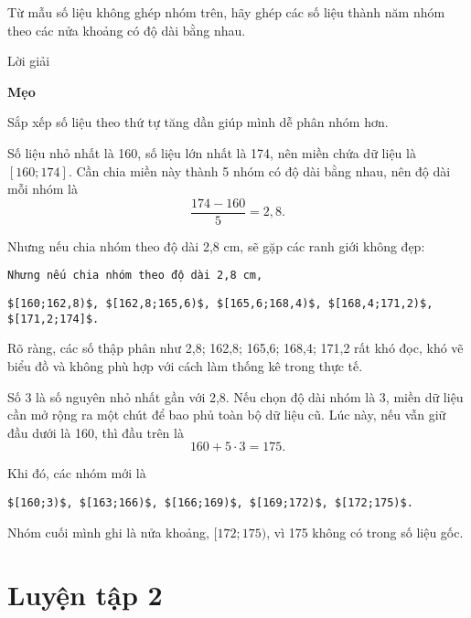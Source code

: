 \documentclass[
  letterpaper,
  DIV=11,
  numbers=noendperiod]{scrartcl}
\begin{document}
Từ mẫu số liệu không ghép nhóm trên, hãy ghép các số liệu thành năm nhóm
theo các nửa khoảng có độ dài bằng nhau.

\begin{center}
Lời giải
\end{center}

\begin{tcolorbox}[enhanced jigsaw, toprule=.15mm, colback=white, arc=.35mm, left=2mm, opacityback=0, breakable, rightrule=.15mm, bottomrule=.15mm, colframe=quarto-callout-note-color-frame, leftrule=.75mm]

\vspace{-3mm}\textbf{Mẹo}\vspace{3mm}

Sắp xếp số liệu theo thứ tự tăng dần giúp mình dễ phân nhóm hơn.

\end{tcolorbox}

Số liệu nhỏ nhất là 160, số liệu lớn nhất là 174, nên miền chứa dữ liệu
là \([160; 174]\). Cần chia miền này thành 5 nhóm có độ dài bằng nhau,
nên độ dài mỗi nhóm là \[
    \frac{174-160}{5}=2,8.
\]

Nhưng nếu chia nhóm theo độ dài 2,8 cm, sẽ gặp các ranh giới không đẹp:

\begin{verbatim}
Nhưng nếu chia nhóm theo độ dài 2,8 cm,
\end{verbatim}

\begin{verbatim}
$[160;162,8)$, $[162,8;165,6)$, $[165,6;168,4)$, $[168,4;171,2)$, $[171,2;174]$.
\end{verbatim}

Rõ ràng, các số thập phân như 2,8; 162,8; 165,6; 168,4; 171,2 rất khó
đọc, khó vẽ biểu đồ và không phù hợp với cách làm thống kê trong thực
tế.

Số 3 là số nguyên nhỏ nhất gần với 2,8. Nếu chọn độ dài nhóm là 3, miền
dữ liệu cần mở rộng ra một chút để bao phủ toàn bộ dữ liệu cũ. Lúc này,
nếu vẫn giữ đầu dưới là 160, thì đầu trên là \[
    160+5\cdot 3 = 175.
\]

Khi đó, các nhóm mới là

\begin{verbatim}
$[160;3)$, $[163;166)$, $[166;169)$, $[169;172)$, $[172;175)$.
\end{verbatim}

Nhóm cuối mình ghi là nửa khoảng, \([172; 175)\), vì 175 không có trong
số liệu gốc.

\section*{Luyện tập 2}
\end{document}
